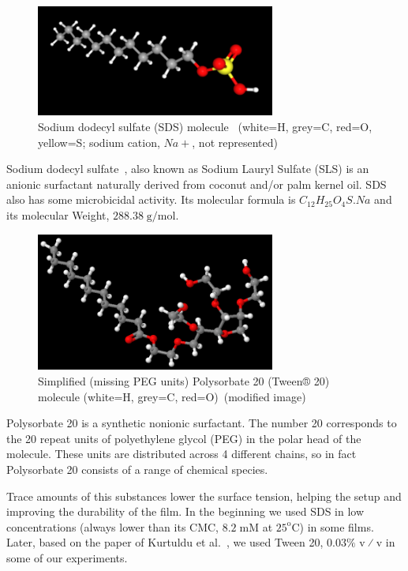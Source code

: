 \begin{figure}[H]
	\centering
	\includegraphics[width=0.7\textwidth]{archivos/SDS.PNG}
	\caption{Sodium dodecyl sulfate (SDS) molecule~\cite{SDS} (white=H, grey=C, red=O, yellow=S; sodium cation, $Na+$, not represented)}
	\label{refraction}
\end{figure}

Sodium dodecyl sulfate~\cite{SDS}, also known as Sodium Lauryl Sulfate (SLS) is an anionic surfactant naturally derived from coconut and/or palm kernel oil. SDS also has some microbicidal activity. Its molecular formula is $C_{12}H_{25}O_4S.Na$ and its molecular Weight, $288.38 \; \textrm{g/mol}$.

\begin{figure}[H]
	\centering
	\includegraphics[width=0.7\textwidth]{archivos/Tween20.PNG}
	\caption{Simplified (missing PEG units) Polysorbate 20 (Tween® 20) molecule (white=H, grey=C, red=O)~\cite{Tween}(modified image)}
	\label{tween}
\end{figure}

Polysorbate 20 is a synthetic nonionic surfactant. The number 20 corresponds to the 20 repeat units of polyethylene glycol (PEG) in the polar head of the molecule. These units are distributed across 4 different chains, so in fact Polysorbate 20 consists of a range of chemical species.

Trace amounts of this substances lower the surface tension, helping the setup and improving the durability of the film. In the beginning we used SDS in low concentrations (always lower than its CMC, $8.2 \; \textrm{mM}$ at $25^\textrm{o} \textrm{C}$) in some films. Later, based on the paper of Kurtuldu et al.~\cite{Kurtuldu2011}, we used Tween 20, $0.03\%$ v~∕~v in some of our experiments.

